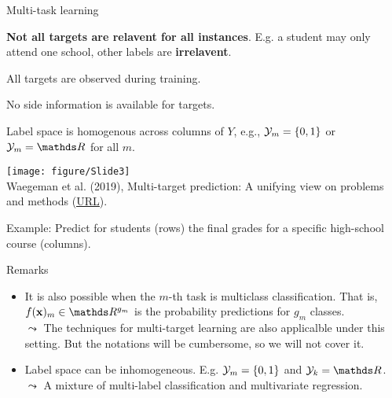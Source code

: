 \documentclass[11pt,compress,t,notes=noshow, xcolor=table]{beamer}
\begin{document}
\begin{frame}{Multi-task learning}

		\begin{itemize}
			
			\begin{minipage}{0.45\textwidth}  

                \item \textbf{Not all targets are relavent for all instances}. E.g. a student may only attend one school, other labels are \textbf{irrelavent}.
                
                \item All targets are observed during training.

			    \item No side information is available for targets. 
       
				\item Label space is homogenous across columns of $Y$, e.g., $\mathcal{Y}_m = \{0,1\}$ or $\Yspace_m = \R$ for all $m$.

			\end{minipage}
            \hfill
			\begin{minipage}{0.45\textwidth}    
				\begin{center} 	
					\texttt{[image: figure/Slide3]} \tiny
					\\ Waegeman et al. (2019), Multi-target prediction:
					A unifying view on problems and methods (\href{https://arxiv.org/pdf/1809.02352.pdf}{\underline{URL}}).	
				\end{center}
			\end{minipage}
		\end{itemize}
	Example: Predict for students (rows) the final grades for a specific high-school course (columns).


\end{frame}

\begin{frame}{Remarks}

		\begin{itemize}
            \item It is also possible when the $m$-th task is multiclass classification. That is, $f(\xv)_m \in \R^{g_m}$ is the probability predictions for $g_m$ classes. \\
            $\leadsto$ The techniques for multi-target learning are also applicalble under this setting. But the notations will be cumbersome, so we will not cover it.

            \item Label space can be inhomogeneous. E.g. $\mathcal{Y}_m = \{0, 1\}$ and $\Yspace_k = \R$. \\
            $\leadsto$ A mixture of multi-label classification and multivariate regression.
            
		\end{itemize}

\end{frame}
\end{document}
